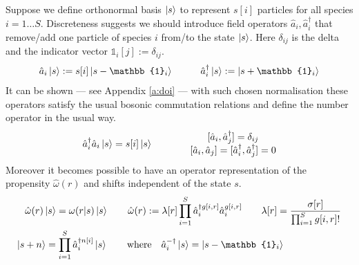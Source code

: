 \documentclass{article}[12pt]
\numberwithin{equation}{section}
\begin{document}
Suppose we define orthonormal basis $\ket{s}$ to represent $s[i]$ particles for
all species $i=1\dots S$. Discreteness suggests we should introduce field operators
$\hat{a}_i,\hat{a}_i^{\dagger}$ that remove/add one particle of species $i$ from/to the state
$\ket{s}$. Here $\delta_{ij}$ is the delta and the indicator vector $\mathbb{1}_i[j]:=\delta_{ij}$.
\begin{align}
	\begin{matrix}
		\hat{a}_i\ket{s}:=s[i]\ket{s-\mathbb{1}_i} &&& \hat{a}_i^{\dagger}\ket{s}:=\ket{s+\mathbb{1}_i}
	\end{matrix}
	\label{eq:fieldoperators}
\end{align}
It can be shown --- see Appendix \ref{a:doi} --- with such chosen
normalisation these operators
satisfy the usual bosonic commutation relations and define the number operator
in the usual way.
\begin{align}
	\begin{matrix}
		\hat{a}_i^{\dagger}\hat{a}_i\ket{s}=s[i]\ket{s}
	\end{matrix}
	\qquad\qquad
	\begin{matrix}
		[\hat{a}_i,\hat{a}_j^{\dagger}]=\delta_{ij} \\
		[\hat{a}_i,\hat{a}_j]=[\hat{a}_i^{\dagger},\hat{a}_j^{\dagger}]=0
	\end{matrix}
	\label{eq:commutationrelations}
\end{align}
Moreover it becomes possible to have an
operator representation of the propensity $\hat\omega(r)$ and shifts independent
of the state $s$.
\begin{align}
	\hat\omega(r)\ket{s}=\omega(r|s)\ket{s}
	\qquad
	\hat\omega(r):=
	\lambda[r]
	\prod_{i=1}^S
	\hat{a}_i^{\dagger g[i,r]}\hat{a}_i^{g[i,r]}
	\qquad
	\lambda[r]=
	\frac{\sigma[r]}{\prod_{i=1}^Sg[i,r]!}
	\label{eq:propensityoperator}
	\\
	\ket{s+n} =
	\prod_{i=1}^S\hat{a}_i^{\dagger n[i]}
	\ket{s}\qquad
	\text{where}\quad
	\hat{a}_i^{-\dagger}\ket{s}=\ket{s-\mathbb{1}_i}
	\qquad\qquad\qquad
	\label{eq:shiftoperator}
\end{align}
\end{document}
